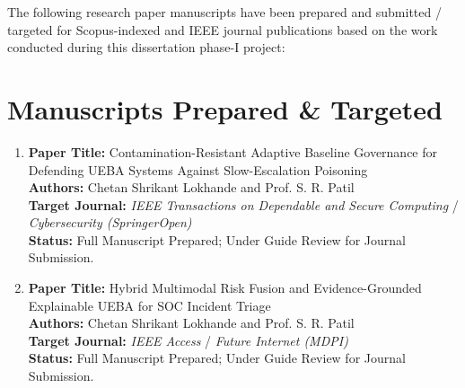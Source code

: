 \documentclass[12pt,a4paper]{report}
\begin{document}
The following research paper manuscripts have been prepared and submitted / targeted for Scopus-indexed and IEEE journal publications based on the work conducted during this dissertation phase-I project:

\section{Manuscripts Prepared \& Targeted}

\begin{enumerate}
    \item \textbf{Paper Title:} Contamination-Resistant Adaptive Baseline Governance for Defending UEBA Systems Against Slow-Escalation Poisoning\\
    \textbf{Authors:} Chetan Shrikant Lokhande and Prof. S. R. Patil\\
    \textbf{Target Journal:} \textit{IEEE Transactions on Dependable and Secure Computing} / \textit{Cybersecurity (SpringerOpen)}\\
    \textbf{Status:} Full Manuscript Prepared; Under Guide Review for Journal Submission.
    
    \vspace{0.5cm}
    
    \item \textbf{Paper Title:} Hybrid Multimodal Risk Fusion and Evidence-Grounded Explainable UEBA for SOC Incident Triage\\
    \textbf{Authors:} Chetan Shrikant Lokhande and Prof. S. R. Patil\\
    \textbf{Target Journal:} \textit{IEEE Access} / \textit{Future Internet (MDPI)}\\
    \textbf{Status:} Full Manuscript Prepared; Under Guide Review for Journal Submission.
\end{enumerate}
\end{document}
